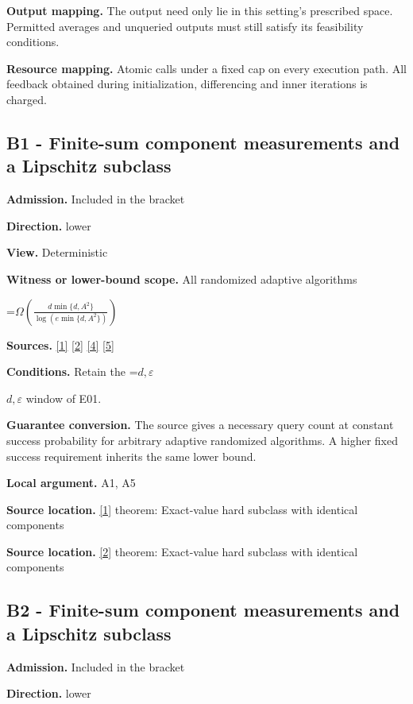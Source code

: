 \documentclass[10pt,a4paper]{article}
\newcommand{\AtlasMath}[1]{\par\begingroup\centering\setbox0=\hbox{$\displaystyle #1$}\ifdim\wd0>1.4\linewidth\typeout{ATLAS WIDE FORMULA: \the\wd0}\fi\ifdim\wd0>\linewidth\resizebox{\linewidth}{!}{\box0}\else\box0\fi\par\endgroup}
\newcommand{\AtlasInlineMath}[1]{\begingroup\setbox0=\hbox{$#1$}\ifdim\wd0>.4\linewidth\endgroup\AtlasMath{#1}\else\endgroup$#1$\fi}
\begin{document}
\textbf{Output mapping.} The output need only lie in this setting's prescribed space. Permitted averages and unqueried outputs must still satisfy its feasibility conditions.

\textbf{Resource mapping.} Atomic calls under a fixed cap on every execution path. All feedback obtained during initialization, differencing and inner iterations is charged.

\subsection{B1 - Finite-sum component measurements and a Lipschitz subclass}
\textbf{Admission.} Included in the bracket

\textbf{Direction.} lower

\textbf{View.} Deterministic

\textbf{Witness or lower-bound scope.} All randomized adaptive algorithms

\AtlasMath{\Omega\!\left(\frac{d\min\{d,A^2\}}{\log(e\min\{d,A^2\})}\right)}
\textbf{Sources.} \href{https://arxiv.org/html/2610.00345v1}{[1]} \href{https://arxiv.org/html/2607.16558v2}{[2]} \href{https://www.mathnet.ru/php/archive.phtml?jrnid=mzm&option_lang=eng&paperid=1697&wshow=paper}{[4]} \href{https://arxiv.org/abs/2109.08858}{[5]}

\textbf{Conditions.} Retain the \AtlasInlineMath{d,\varepsilon} window of E01.

\textbf{Guarantee conversion.} The source gives a necessary query count at constant success probability for arbitrary adaptive randomized algorithms. A higher fixed success requirement inherits the same lower bound.

\textbf{Local argument.} A1, A5

\textbf{Source location.} \href{https://arxiv.org/html/2610.00345v1}{[1]} theorem: Exact-value hard subclass with identical components

\textbf{Source location.} \href{https://arxiv.org/html/2607.16558v2}{[2]} theorem: Exact-value hard subclass with identical components

\subsection{B2 - Finite-sum component measurements and a Lipschitz subclass}
\textbf{Admission.} Included in the bracket

\textbf{Direction.} lower
\end{document}
